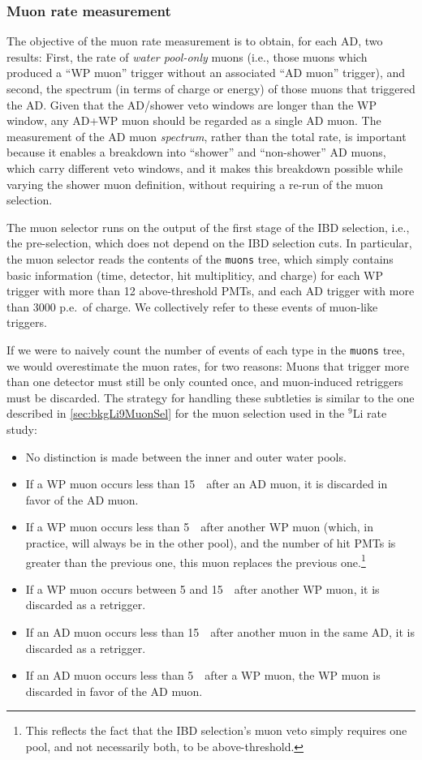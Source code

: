 \documentclass[../thesis.tex]{subfiles}
\begin{document}
\subsubsection{Muon rate measurement}%
\label{sec:cutVaryMuRate}

The objective of the muon rate measurement is to obtain, for each AD, two results: First, the rate of \emph{water pool-only} muons (i.e., those muons which produced a ``WP muon'' trigger without an associated ``AD muon'' trigger), and second, the spectrum (in terms of charge or energy) of those muons that triggered the AD\@. Given that the AD/shower veto windows are longer than the WP window, any AD+WP muon should be regarded as a single AD muon. The measurement of the AD muon \emph{spectrum}, rather than the total rate, is important because it enables a breakdown into ``shower'' and ``non-shower'' AD muons, which carry different veto windows, and it makes this breakdown possible while varying the shower muon definition, without requiring a re-run of the muon selection.

The muon selector runs on the output of the first stage of the IBD selection, i.e., the pre-selection, which does not depend on the IBD selection cuts. In particular, the muon selector reads the contents of the \texttt{muons} tree, which simply contains basic information (time, detector, hit multipliticy, and charge) for each WP trigger with more than 12 above-threshold PMTs, and each AD trigger with more than 3000 p.e.\ of charge. We collectively refer to these events of muon-like triggers.

If we were to naively count the number of events of each type in the \texttt{muons} tree, we would overestimate the muon rates, for two reasons: Muons that trigger more than one detector must still be only counted once, and muon-induced retriggers must be discarded. The strategy for handling these subtleties is similar to the one described in \autoref{sec:bkgLi9MuonSel} for the muon selection used in the $^9$Li rate study:

\begin{itemize}
\item No distinction is made between the inner and outer water pools.
\item If a WP muon occurs less than 15~\us\ after an AD muon, it is discarded in favor of the AD muon.
\item If a WP muon occurs less than 5~\us\ after another WP muon (which, in practice, will always be in the other pool), and the number of hit PMTs is greater than the previous one, this muon replaces the previous one.\footnote{This reflects the fact that the IBD selection's muon veto simply requires one pool, and not necessarily both, to be above-threshold.}
\item If a WP muon occurs between 5 and 15~\us\ after another WP muon, it is discarded as a retrigger.
\item If an AD muon occurs less than 15~\us\ after another muon in the same AD, it is discarded as a retrigger.
\item If an AD muon occurs less than 5~\us\ after a WP muon, the WP muon is discarded in favor of the AD muon.
\end{itemize}
\end{document}
